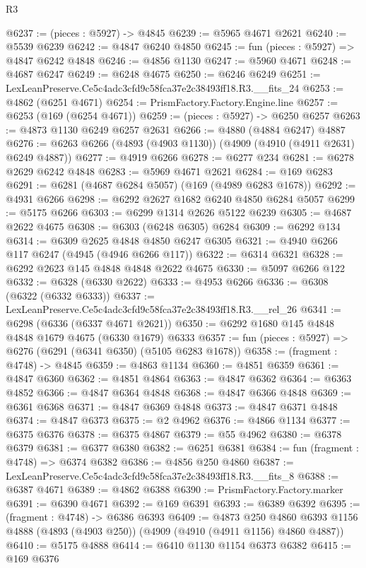 \begin{lexlean}{R3}
\begin{coremodule}
@6237 := (pieces : @5927) -> @4845
@6239 := @5965 @4671 @2621
@6240 := @5539 @6239
@6242 := @4847 @6240 @4850
@6245 := fun (pieces : @5927) => @4847 @6242 @4848
@6246 := @4856 @1130
@6247 := @5960 @4671
@6248 := @4687 @6247
@6249 := @6248 @4675
@6250 := @6246 @6249
@6251 := LexLeanPreserve.Ce5c4adc3cfd9c58fca37e2c38493ff18.R3.__fits_24
@6253 := @4862 (@6251 @4671)
@6254 := PrismFactory.Factory.Engine.line
@6257 := @6253 (@169 (@6254 @4671))
@6259 := (pieces : @5927) -> @6250 @6257
@6263 := @4873 @1130 @6249 @6257 @2631
@6266 := @4880 (@4884 @6247) @4887
@6276 := @6263 @6266 (@4893 (@4903 @1130)) (@4909 (@4910 (@4911 @2631) @6249 @4887))
@6277 := @4919 @6266
@6278 := @6277 @234
@6281 := @6278 @2629 @6242 @4848
@6283 := @5969 @4671 @2621
@6284 := @169 @6283
@6291 := @6281 (@4687 @6284 @5057) (@169 (@4989 @6283 @1678))
@6292 := @4931 @6266
@6298 := @6292 @2627 @1682 @6240 @4850 @6284 @5057
@6299 := @5175 @6266
@6303 := @6299 @1314 @2626 @5122 @6239
@6305 := @4687 @2622 @4675
@6308 := @6303 (@6248 @6305) @6284
@6309 := @6292 @134
@6314 := @6309 @2625 @4848 @4850 @6247 @6305
@6321 := @4940 @6266 @117 @6247 (@4945 (@4946 @6266 @117))
@6322 := @6314 @6321
@6328 := @6292 @2623 @145 @4848 @4848 @2622 @4675
@6330 := @5097 @6266 @122
@6332 := @6328 (@6330 @2622)
@6333 := @4953 @6266
@6336 := @6308 (@6322 (@6332 @6333))
@6337 := LexLeanPreserve.Ce5c4adc3cfd9c58fca37e2c38493ff18.R3.__rel_26
@6341 := @6298 (@6336 (@6337 @4671 @2621))
@6350 := @6292 @1680 @145 @4848 @4848 @1679 @4675 (@6330 @1679) @6333
@6357 := fun (pieces : @5927) => @6276 (@6291 (@6341 @6350) (@5105 @6283 @1678))
@6358 := (fragment : @4748) -> @4845
@6359 := @4863 @1134
@6360 := @4851 @6359
@6361 := @4847 @6360
@6362 := @4851 @4864
@6363 := @4847 @6362
@6364 := @6363 @4852
@6366 := @4847 @6364 @4848
@6368 := @4847 @6366 @4848
@6369 := @6361 @6368
@6371 := @4847 @6369 @4848
@6373 := @4847 @6371 @4848
@6374 := @4847 @6373
@6375 := @2 @4962
@6376 := @4866 @1134
@6377 := @6375 @6376
@6378 := @6375 @4867
@6379 := @55 @4962
@6380 := @6378 @6379
@6381 := @6377 @6380
@6382 := @6251 @6381
@6384 := fun (fragment : @4748) => @6374 @6382
@6386 := @4856 @250 @4860
@6387 := LexLeanPreserve.Ce5c4adc3cfd9c58fca37e2c38493ff18.R3.__fits_8
@6388 := @6387 @4671
@6389 := @4862 @6388
@6390 := PrismFactory.Factory.marker
@6391 := @6390 @4671
@6392 := @169 @6391
@6393 := @6389 @6392
@6395 := (fragment : @4748) -> @6386 @6393
@6409 := @4873
    @250
    @4860
    @6393
    @1156
    @4888
    (@4893 (@4903 @250))
    (@4909 (@4910 (@4911 @1156) @4860 @4887))
@6410 := @5175 @4888
@6414 := @6410 @1130 @1154 @6373 @6382
@6415 := @169 @6376

\end{coremodule}
\end{lexlean}
